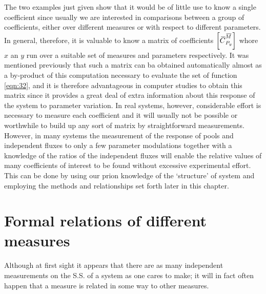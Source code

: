The two examples just given show that it would be of little use to know a single coefficient since usually we are interested in comparisons between a group of coefficients, either over different measures or with respect to different parameters. In general, therefore, it is valuable to know a matrix of coefficients $\left[\,\overline{\!{C}}^{\,\overline{\!{M}}}_{P_y}\right]$ whore $x$ an $y$ run over a suitable set of measures and parameters respectively. It was mentioned previously that such a matrix can ba obtained automatically almost as a by-product of this computation necessary to evaluate the set of function \eqref{eqn:32}, and it is therefore advantageous in computer studies to obtain this matrix since it provides a great deal of extra information about this response of the system to parameter variation. In real systems, however, considerable effort is necessary to measure each coefficient and it will usually not be possible or worthwhile to build up any sort of matrix by straightforward measurements. However, in many systems the measurement of the response of pools and independent fluxes to only a few parameter modulations together with a knowledge of the ratios of the independent fluxes will enable the relative values of many coefficients of interest to be found without excessive experimental effort. This can be done by using our prion knowledge of the `structure' of system and employing the methods and relationships set forth later in this chapter.

\section{Formal relations of different measures}

Although at first sight it appears that there are as many independent measurements on the S.S. of a system as one cares to make; it will in fact often happen that a measure is related in some way to other measures.

